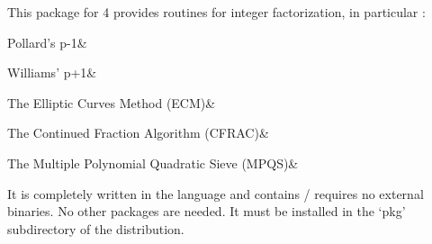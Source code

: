 
This package for {\GAP} 4 provides routines for 
integer factorization, in particular :

\beginitems
Pollard's p-1&

Williams' p+1&

The Elliptic Curves Method (ECM)&

The Continued Fraction Algorithm (CFRAC)&

The Multiple Polynomial Quadratic Sieve (MPQS)&
\enditems

It is completely written in the {\GAP} language and contains /
requires no external binaries. No other packages are needed.
It must be installed in the `pkg' subdirectory of the
{\GAP} distribution.

